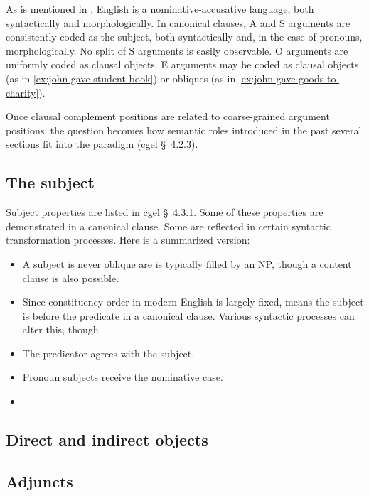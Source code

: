 \documentclass{article}
\newcommand*{\citesec}[1]{\S~{#1}}
\begin{document}
As is mentioned in ,
English is a nominative-accusative language,
both syntactically and morphologically.
In canonical clauses,
A and S arguments are consistently coded as the subject, both syntactically and, 
in the case of pronouns, morphologically.
No split of S arguments is easily observable. %
O arguments are uniformly coded as clausal objects.
E arguments may be coded as clausal objects (as in \eqref{ex:john-gave-student-book}) 
or obliques (as in \eqref{ex:john-gave-goods-to-charity}).

Once clausal complement positions are related to coarse-grained argument positions,
the question becomes how semantic roles introduced in the past several sections 
fit into the paradigm (\ac{cgel} \citesec{4.2.3}).


\subsection{The subject} \label{sec:subject}

Subject properties are listed in \ac{cgel} \citesec{4.3.1}. 
Some of these properties are demonstrated in a canonical clause.
Some are reflected in certain syntactic transformation processes.
Here is a summarized version:
\begin{itemize}
    \item A subject is never oblique are is typically filled by an NP, though a content clause is also possible.
    \item Since constituency order in modern English is largely fixed,
     means the subject is before the predicate in a canonical clause.
    Various syntactic processes can alter this, though.
    \item The predicator agrees with the subject.
    \item Pronoun subjects receive the nominative case.
    \item  
\end{itemize}

\subsection{Direct and indirect objects}\label{sec:object}

\subsection{Adjuncts}\label{sec:adjuncts-classification}
\end{document}
